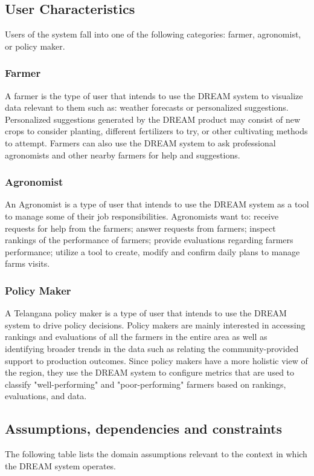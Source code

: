 \subsection{User Characteristics}
\begin{flushleft}
Users of the system fall into one of the following categories: farmer, agronomist, or policy maker.
\subsubsection{Farmer}
A farmer is the type of user that intends to use the DREAM system to visualize data relevant to them such as: weather forecasts or personalized suggestions. Personalized suggestions generated by the DREAM product may consist of new crops to consider planting, different fertilizers to try, or other cultivating methods to attempt. Farmers can also use the DREAM system to ask professional agronomists and other nearby farmers for help and suggestions.\\
\subsubsection{Agronomist}
An Agronomist is a type of user that intends to use the DREAM system as a tool to manage some of their job responsibilities. Agronomists want to: receive requests for help from the farmers; answer requests from farmers; inspect rankings of the performance of farmers; provide evaluations regarding farmers performance; utilize a tool to create, modify and confirm daily plans to manage farms visits.
\subsubsection{Policy Maker}
A Telangana policy maker is a type of user that intends to use the DREAM system to drive policy decisions. Policy makers are mainly interested in accessing rankings and evaluations of all the farmers in the entire area as well as identifying broader trends in the data such as relating the community-provided support to production outcomes. Since policy makers have a more holistic view of the region, they use the DREAM system to configure metrics that are used to classify "well-performing" and "poor-performing" farmers based on rankings, evaluations, and data.\\
\end{flushleft}

\subsection{Assumptions, dependencies and constraints}
\begin{flushleft}
The following table lists the domain assumptions relevant to the context in which the DREAM system operates.
\end{flushleft} 


